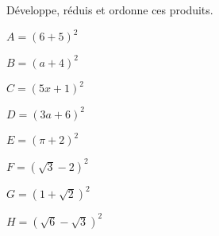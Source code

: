 
Développe, réduis et ordonne ces produits.

\begin{minipage}{4cm}
\begin{description}
\item $A=(6+5)^2$
\item $B=(a+4)^2$
\end{description}
\end{minipage}
\begin{minipage}{4cm}
\begin{description}
\item $C=(5x+1)^2$
\item $D=(3a+6)^2$
\end{description}
\end{minipage}
\begin{minipage}{4cm}
\begin{description}
\item $E=(\pi+2)^2$
\item $F=(\sqrt{3}-2)^2$
\end{description}
\end{minipage}
\begin{minipage}{4cm}
\begin{description}
\item $G=(1+\sqrt{2})^2$
\item $H=(\sqrt{6}-\sqrt{3})^2$
\end{description}
\end{minipage}